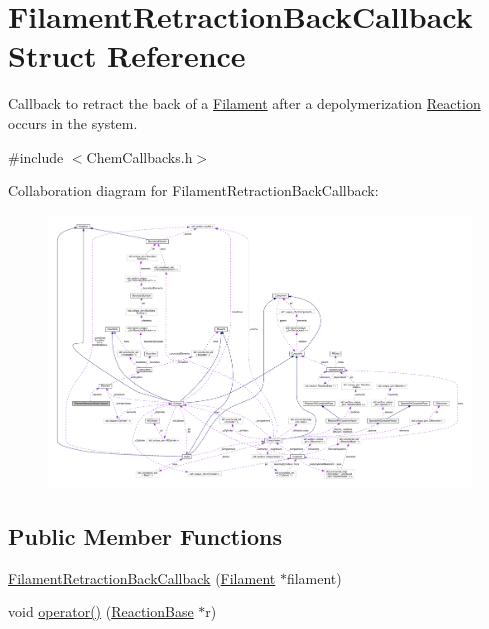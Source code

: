 \hypertarget{structFilamentRetractionBackCallback}{\section{Filament\+Retraction\+Back\+Callback Struct Reference}
\label{structFilamentRetractionBackCallback}
}


Callback to retract the back of a \hyperlink{classFilament}{Filament} after a depolymerization \hyperlink{classReaction}{Reaction} occurs in the system.  




{\ttfamily \#include $<$Chem\+Callbacks.\+h$>$}



Collaboration diagram for Filament\+Retraction\+Back\+Callback\+:
\nopagebreak
\begin{figure}[H]
\begin{center}
\leavevmode
\includegraphics[width=350pt]{structFilamentRetractionBackCallback__coll__graph}
\end{center}
\end{figure}
\subsection*{Public Member Functions}
\begin{DoxyCompactItemize}
\item 
\hyperlink{structFilamentRetractionBackCallback_a2c399ba7ead0c7adfa8823ff36ba1c2c}{Filament\+Retraction\+Back\+Callback} (\hyperlink{classFilament}{Filament} $\ast$filament)
\item 
void \hyperlink{structFilamentRetractionBackCallback_a73f635852200f930ac3829085fcd76db}{operator()} (\hyperlink{classReactionBase}{Reaction\+Base} $\ast$r)
\end{DoxyCompactItemize}
